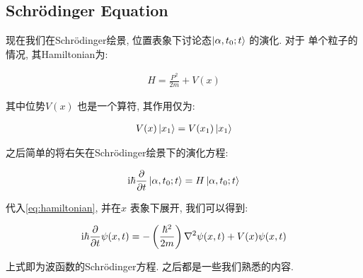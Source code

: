 \subsection{Schr\"odinger Equation}

现在我们在Schr\"odinger绘景, 位置表象下讨论态$\ket{\alpha, t_0; t}$ 的演化. 对于
单个粒子的情况, 其Hamiltonian为:

\begin{equation}\label{eq:hamiltonian}
  \begin{aligned}
    H = \frac{P^{2}}{2m} + V(x)
  \end{aligned}
\end{equation}

其中位势$V(x)$ 也是一个算符, 其作用仅为:

\begin{equation}
  \begin{aligned}
    V(x)\ket{x_1} = V(x_1) \ket{x_1}
  \end{aligned}
\end{equation}

之后简单的将右矢在Schr\"odinger绘景下的演化方程:

\begin{equation}
  \begin{aligned}
    {\rm i} \hbar \pdv{}{t} \ket{\alpha, t_0; t} = H \ket{\alpha, t_0; t}
  \end{aligned}
\end{equation} 

代入\ref{eq:hamiltonian}, 并在$x$ 表象下展开, 我们可以得到:

\begin{equation}
  \begin{aligned}
    {\rm i}\hbar \pdv{}{t} \psi(x, t) = - \left(\frac{\hbar^{2}}{2m}\right) \nabla^{2} \psi(x, t) + V(x) \psi(x,t)
  \end{aligned}
\end{equation}

上式即为波函数的Schr\"odinger方程. 之后都是一些我们熟悉的内容.
